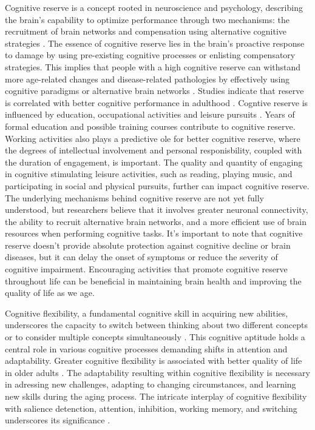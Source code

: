 Cognitive reserve is a concept rooted in neuroscience and psychology, describing the brain's capability to optimize performance through two mechanisms: the recruitment of brain networks and compensation using alternative cognitive strategies \cite{Nucci2012}. The essence of cognitive reserve lies in the brain's proactive response to damage by using pre-existing cognitive processes or enlisting compensatory strategies. This implies that people with a high cognitive reserve can withstand more age-related changes and disease-related pathologies by effectively using cognitive paradigms or alternative brain networks \cite{Stern2009}. Studies indicate that reserve is correlated with better cognitive performance in adulthood \cite{Panico2022}. 
Cogntive reserve is influenced by education, occupational activities and leisure pursuits \cite{Nucci2012}. Years of formal education and possible training courses contribute to cognitive reserve. Working activities also plays a predictive ole for better cognitive reserve, where the degrees of intellectual involvement and personal responisbility, coupled with the duration of engagement, is important. The quality and quantity of engaging in cognitive stimulating leisure activities, such as reading, playing music, and participating in social and physical pursuits, further can impact cognitive reserve.
The underlying mechanisms behind cognitive reserve are not yet fully understood, but researchers believe that it involves greater neuronal connectivity, the ability to recruit alternative brain networks, and a more efficient use of brain resources when performing cognitive tasks.
It's important to note that cognitive reserve doesn't provide absolute protection against cognitive decline or brain diseases, but it can delay the onset of symptoms or reduce the severity of cognitive impairment. Encouraging activities that promote cognitive reserve throughout life can be beneficial in maintaining brain health and improving the quality of life as we age.

Cognitive flexibility, a fundamental cognitive skill in acquiring new abilities, underscores the capacity to switch between thinking about two different concepts or to consider multiple concepts simultaneously \cite{Scott1962}. This cognitive aptitude holds a central role in various cognitive processes demanding shifts in attention and adaptability. Greater cognitive flexibility is associated with better quality of life in older adults \cite{Davis2010}. The adaptability resulting within cognitive flexibility is necessary in adressing new challenges, adapting to changing circumstances, and learning new skills during the aging process. The intricate interplay of cognitive flexibility with salience detenction, attention, inhibition, working memory, and switching underscores its significance \cite{Dajani2015}.


